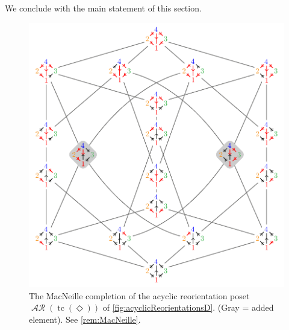 \documentclass{amsart}
\theoremstyle{definition}
\renewcommand{\c}[1]{\mathcal{#1}} %
\DeclareMathOperator{\tc}{tc} %
\DeclareMathOperator{\AReori}{\c{AR}}  %
\newcommand{\Dgraph}{\boldsymbol{\Diamond}} %
\begin{document}
We conclude with the main statement of this section.
%
\begin{figure}[b]
	\centerline{\includegraphics[scale=.68]{MacNeilleAcyclicReorientationsD}}
	\caption{The MacNeille completion of the acyclic reorientation poset~$\AReori(\tc(\Dgraph))$ of \cref{fig:acyclicReorientationsD}. (Gray = added element). See \cref{rem:MacNeille}.}
	\label{fig:MacNeilleAcyclicReorientationsD}
\end{figure}
%
\end{document}
